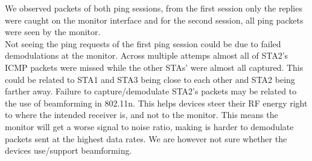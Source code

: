 We observed packets of both ping sessions, from the first session only the replies were caught on the monitor interface and for the second session, all ping packets were seen by the monitor.\\
%
Not seeing the ping requests of the first ping session could be due to failed demodulations at the monitor. Across multiple attemps almost all of STA2's ICMP packets were missed while the other STAs' were almost all captured. This could be related to STA1 and STA3 being close to each other and STA2 being farther away.
%
Failure to capture/demodulate STA2's packets may be related to the use of beamforming in 802.11n. This helps devices steer their RF energy right
to where the intended receiver is, and not to the monitor. This means the monitor will
get a worse signal to noise ratio, making is harder to demodulate packets sent at the highest data rates. We are however not sure whether the devices use/support beamforming.
